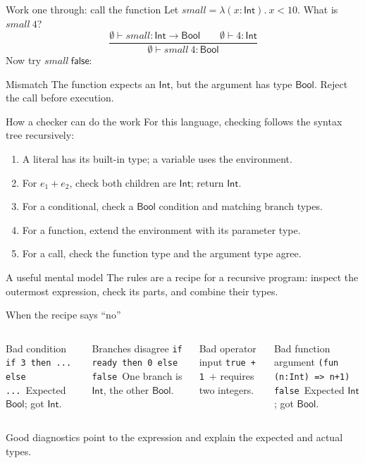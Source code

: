 \documentclass[aspectratio=169,11pt]{beamer}
\newcommand{\Bool}{\mathsf{Bool}}
\newcommand{\Int}{\mathsf{Int}}
\newcommand{\Arrow}{\mathbin{\to}}
\begin{document}
\begin{frame}{Work one through: call the function}
Let $\mathit{small}=\lambda(x:\Int).\ x<10$. What is $\mathit{small}\ 4$?
\[
\frac{\emptyset\vdash\mathit{small}:\Int\Arrow\Bool\qquad
      \emptyset\vdash 4:\Int}
     {\emptyset\vdash\mathit{small}\ 4:\Bool}
\]
Now try $\mathit{small}\ \mathsf{false}$:
\begin{alertblock}{Mismatch}
The function expects an $\Int$, but the argument has type $\Bool$. Reject the call before execution.
\end{alertblock}
\end{frame}

\begin{frame}{How a checker can do the work}
For this language, checking follows the syntax tree recursively:
\begin{enumerate}
  \item A literal has its built-in type; a variable uses the environment.
  \item For $e_1+e_2$, check both children are $\Int$; return $\Int$.
  \item For a conditional, check a $\Bool$ condition and matching branch types.
  \item For a function, extend the environment with its parameter type.
  \item For a call, check the function type and the argument type agree.
\end{enumerate}
\begin{block}{A useful mental model}
The rules are a recipe for a recursive program: inspect the outermost expression, check its parts, and combine their types.
\end{block}
\end{frame}

\begin{frame}{When the recipe says “no”}
\begin{columns}[T]
\begin{alertblock}{Bad condition}
\texttt{if 3 then ... else ...}\
Expected $\Bool$; got $\Int$.
\end{alertblock}
\begin{alertblock}{Branches disagree}
\texttt{if ready then 0 else false}\
One branch is $\Int$, the other $\Bool$.
\end{alertblock}
\begin{alertblock}{Bad operator input}
\texttt{true + 1}\
$+$ requires two integers.
\end{alertblock}
\begin{alertblock}{Bad function argument}
\texttt{(fun (n:Int) => n+1) false}\
Expected $\Int$; got $\Bool$.
\end{alertblock}
\end{columns}
\medskip
Good diagnostics point to the expression and explain the expected and actual types.
\end{frame}
\end{document}
